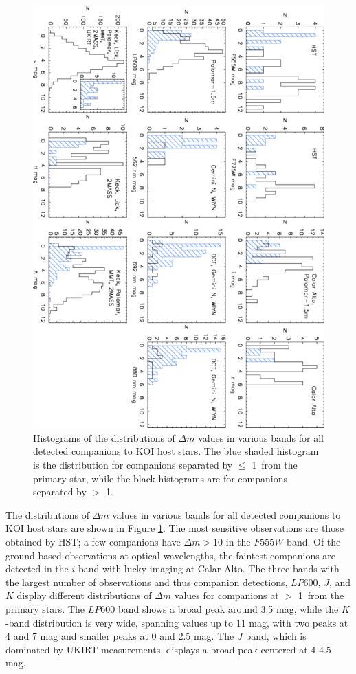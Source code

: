 \documentclass[twocolumn,appendixfloats]{aastex6}
\begin{document}
\begin{figure}[!]
\centering
\includegraphics[angle=90,scale=0.7]{KOI_mag_histo.pdf}
\caption{Histograms of the distributions of $\Delta m$ values in various 
bands for all detected companions to KOI host stars. The blue shaded 
histogram is the distribution for companions separated by $\leq$ 
1\arcsec\ from the primary star, while the black histograms are for 
companions separated by $>$ 1\arcsec.
\label{KOI_mag_histo}}
\end{figure}

The distributions of $\Delta m$ values in various bands for all detected 
companions to KOI host stars are shown in Figure \ref{KOI_mag_histo}.
The most sensitive observations are those obtained by HST; a few
companions have $\Delta m > 10$ in the $F555W$ band. Of the 
ground-based observations at optical wavelengths, the faintest
companions are detected in the $i$-band with lucky imaging at
Calar Alto. 
The three bands with the largest number of observations and thus
companion detections, $LP600$, $J$, and $K$ display different
distributions of $\Delta m$ values for companions at $>$ 1\arcsec\
from the primary stars. The $LP600$ band shows a broad peak
around 3.5 mag, while the $K$-band distribution is very wide,
spanning values up to 11 mag, with two peaks at 4 and 7 mag
and smaller peaks at 0 and 2.5 mag. The $J$ band, which is
dominated by UKIRT measurements, displays a broad peak
centered at 4-4.5 mag. 
\end{document}
